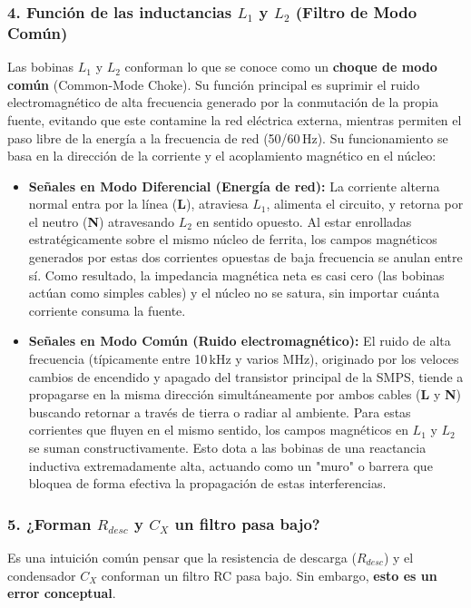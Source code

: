 \documentclass[12pt, a4paper]{article}
\begin{document}
\subsubsection*{4. Función de las inductancias $L_1$ y $L_2$ (Filtro de Modo Común)}
Las bobinas $L_1$ y $L_2$ conforman lo que se conoce como un \textbf{choque de modo común} (Common-Mode Choke). Su función principal es suprimir el ruido electromagnético de alta frecuencia generado por la conmutación de la propia fuente, evitando que este contamine la red eléctrica externa, mientras permiten el paso libre de la energía a la frecuencia de red (50/60\,Hz). Su funcionamiento se basa en la dirección de la corriente y el acoplamiento magnético en el núcleo:
\begin{itemize}
    \item \textbf{Señales en Modo Diferencial (Energía de red):} La corriente alterna normal entra por la línea (\textbf{L}), atraviesa $L_1$, alimenta el circuito, y retorna por el neutro (\textbf{N}) atravesando $L_2$ en sentido opuesto. Al estar enrolladas estratégicamente sobre el mismo núcleo de ferrita, los campos magnéticos generados por estas dos corrientes opuestas de baja frecuencia se anulan entre sí. Como resultado, la impedancia magnética neta es casi cero (las bobinas actúan como simples cables) y el núcleo no se satura, sin importar cuánta corriente consuma la fuente.
    \item \textbf{Señales en Modo Común (Ruido electromagnético):} El ruido de alta frecuencia (típicamente entre 10\,kHz y varios MHz), originado por los veloces cambios de encendido y apagado del transistor principal de la SMPS, tiende a propagarse en la misma dirección simultáneamente por ambos cables (\textbf{L} y \textbf{N}) buscando retornar a través de tierra o radiar al ambiente. Para estas corrientes que fluyen en el mismo sentido, los campos magnéticos en $L_1$ y $L_2$ se suman constructivamente. Esto dota a las bobinas de una reactancia inductiva extremadamente alta, actuando como un "muro" o barrera que bloquea de forma efectiva la propagación de estas interferencias.
\end{itemize}

\subsubsection*{5. ¿Forman $R_{desc}$ y $C_X$ un filtro pasa bajo?}
Es una intuición común pensar que la resistencia de descarga ($R_{desc}$) y el condensador $C_X$ conforman un filtro RC pasa bajo. Sin embargo, \textbf{esto es un error conceptual}. 
\end{document}
